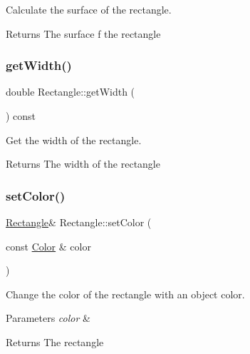 Calculate the surface of the rectangle. 

\begin{DoxyReturn}{Returns}
The surface f the rectangle 
\end{DoxyReturn}
\mbox{\label{classRectangle_a0d38078e09cd3151d3009eed3a449660}} 
\subsubsection{\texorpdfstring{get\+Width()}{getWidth()}}
{\footnotesize\ttfamily double Rectangle\+::get\+Width (\begin{DoxyParamCaption}{ }\end{DoxyParamCaption}) const}



Get the width of the rectangle. 

\begin{DoxyReturn}{Returns}
The width of the rectangle 
\end{DoxyReturn}
\mbox{\label{classRectangle_adbc9fb0c86095b3245bc5b38ba9619a6}} 
\subsubsection{\texorpdfstring{set\+Color()}{setColor()}\hspace{0.1cm}{\footnotesize\ttfamily [1/2]}}
{\footnotesize\ttfamily \hyperlink{classRectangle}{Rectangle}\& Rectangle\+::set\+Color (\begin{DoxyParamCaption}\item[{const \hyperlink{classColor}{Color} \&}]{color }\end{DoxyParamCaption})}



Change the color of the rectangle with an object color. 


\begin{DoxyParams}{Parameters}
{\em color} & \\
\hline
\end{DoxyParams}
\begin{DoxyReturn}{Returns}
The rectangle 
\end{DoxyReturn}
\mbox{\label{classRectangle_a684b70cefa746172e045702d2e0bdf08}} 
